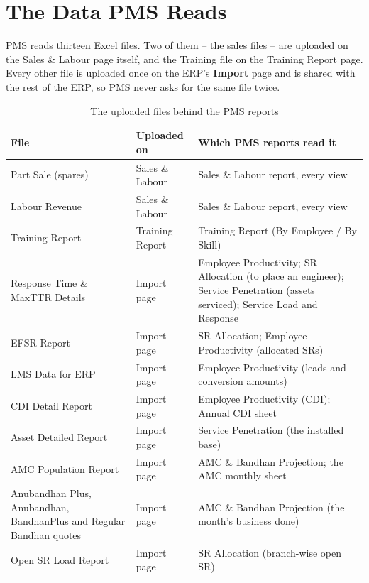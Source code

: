 \documentclass[11pt,a4paper]{article}
\begin{document}
\section{The Data PMS Reads}

PMS reads thirteen Excel files. Two of them -- the sales files -- are uploaded on the
Sales \& Labour page itself, and the Training file on the Training Report page. Every
other file is uploaded once on the ERP's \textbf{Import} page and is shared with the
rest of the ERP, so PMS never asks for the same file twice.

\begin{table}[H]\centering\small
\begin{tabularx}{\linewidth}{@{}p{4.5cm}p{3.3cm}X@{}}
\toprule
\textbf{File} & \textbf{Uploaded on} & \textbf{Which PMS reports read it} \\
\midrule
Part Sale (spares) & Sales \& Labour & Sales \& Labour report, every view \\
Labour Revenue & Sales \& Labour & Sales \& Labour report, every view \\
Training Report & Training Report & Training Report (By Employee / By Skill) \\
\addlinespace
Response Time \& MaxTTR Details & Import page & Employee Productivity; SR Allocation
(to place an engineer); Service Penetration (assets serviced); Service Load and
Response \\
EFSR Report & Import page & SR Allocation; Employee Productivity (allocated SRs) \\
LMS Data for ERP & Import page & Employee Productivity (leads and conversion amounts) \\
CDI Detail Report & Import page & Employee Productivity (CDI); Annual CDI sheet \\
Asset Detailed Report & Import page & Service Penetration (the installed base) \\
AMC Population Report & Import page & AMC \& Bandhan Projection; the AMC monthly sheet \\
Anubandhan Plus, Anubandhan, BandhanPlus and Regular Bandhan quotes &
Import page & AMC \& Bandhan Projection (the month's business done) \\
Open SR Load Report & Import page & SR Allocation (branch-wise open SR) \\
\bottomrule
\end{tabularx}
\caption{The uploaded files behind the PMS reports}
\end{table}
\end{document}
